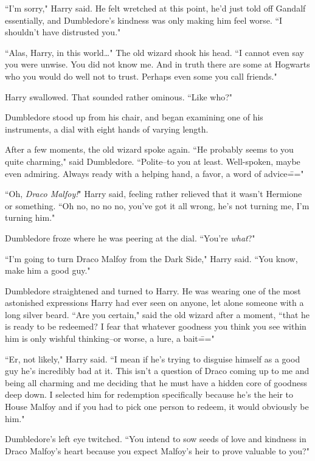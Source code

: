``I'm sorry," Harry said. He felt wretched at this point, he'd just told off Gandalf essentially, and Dumbledore's kindness was only making him feel worse. ``I shouldn't have distrusted you."

``Alas, Harry, in this world{\ldots}" The old wizard shook his head. ``I cannot even say you were unwise. You did not know me. And in truth there are some at Hogwarts who you would do well not to trust. Perhaps even some you call friends."

Harry swallowed. That sounded rather ominous. ``Like who?"

Dumbledore stood up from his chair, and began examining one of his instruments, a dial with eight hands of varying length.

After a few moments, the old wizard spoke again. ``He probably seems to you quite charming," said Dumbledore. ``Polite\---to you at least. Well-spoken, maybe even admiring. Always ready with a helping hand, a favor, a word of advice\==="

``Oh, \emph{Draco Malfoy!}" Harry said, feeling rather relieved that it wasn't Hermione or something. ``Oh no, no no no, you've got it all wrong, he's not turning me, I'm turning him."

Dumbledore froze where he was peering at the dial. ``You're \emph{what}?"

``I'm going to turn Draco Malfoy from the Dark Side," Harry said. ``You know, make him a good guy."

Dumbledore straightened and turned to Harry. He was wearing one of the most astonished expressions Harry had ever seen on anyone, let alone someone with a long silver beard. ``Are you certain," said the old wizard after a moment, ``that he is ready to be redeemed? I fear that whatever goodness you think you see within him is only wishful thinking\---or worse, a lure, a bait\==="

``Er, not likely," Harry said. ``I mean if he's trying to disguise himself as a good guy he's incredibly bad at it. This isn't a question of Draco coming up to me and being all charming and me deciding that he must have a hidden core of goodness deep down. I selected him for redemption specifically because he's the heir to House Malfoy and if you had to pick one person to redeem, it would obviously be him."

Dumbledore's left eye twitched. ``You intend to sow seeds of love and kindness in Draco Malfoy's heart because you expect Malfoy's heir to prove valuable to you?"

